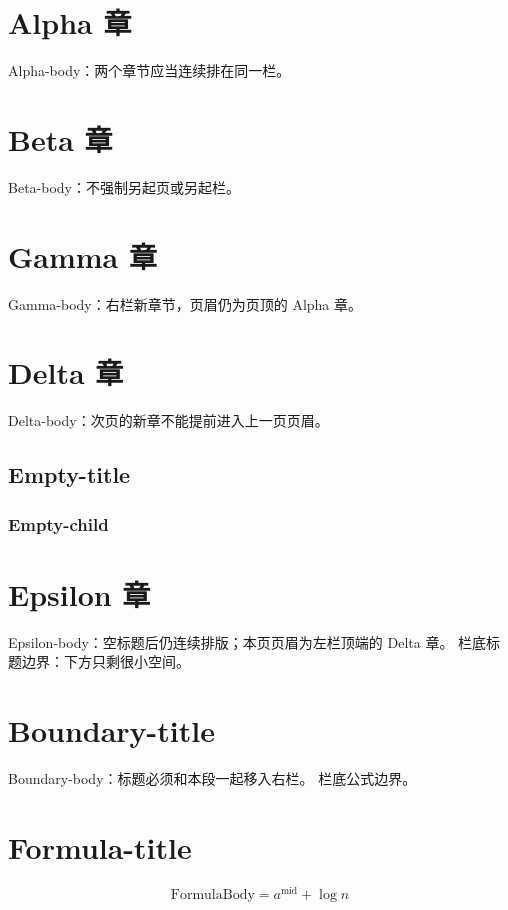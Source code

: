 \section{Alpha 章}
Alpha-body：两个章节应当连续排在同一栏。
\section{Beta 章}
Beta-body：不强制另起页或另起栏。
\newpage
\section{Gamma 章}
Gamma-body：右栏新章节，页眉仍为页顶的 Alpha 章。
\clearpage
\section{Delta 章}
Delta-body：次页的新章不能提前进入上一页页眉。
\subsection{Empty-title}
\subsubsection{Empty-child}
\section{Epsilon 章}
Epsilon-body：空标题后仍连续排版；本页页眉为左栏顶端的 Delta 章。
\clearpage
\noindent 栏底标题边界：下方只剩很小空间。
\par\vspace*{\dimexpr\pagegoal-\pagetotal-.5\baselineskip\relax}
\section{Boundary-title}
Boundary-body：标题必须和本段一起移入右栏。
\clearpage
\noindent 栏底公式边界。
\par\vspace*{\dimexpr\pagegoal-\pagetotal-.5\baselineskip\relax}
\section{Formula-title}
\[\mathrm{FormulaBody}=a^\mathrm{mid}+\log n\]
